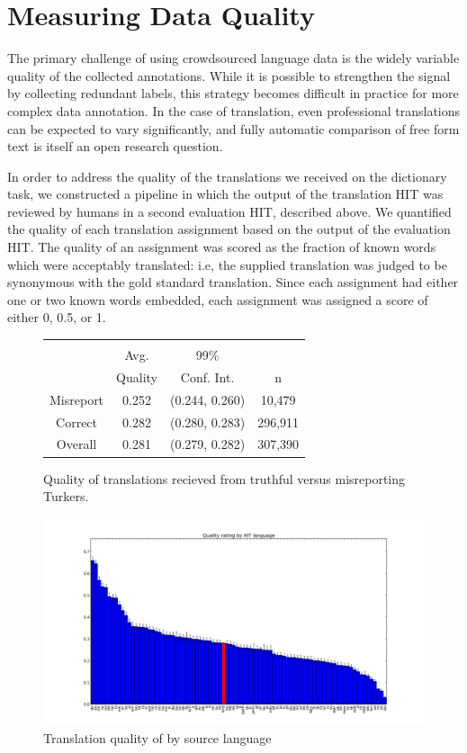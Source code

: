 \documentclass[11pt]{article}
\begin{document}
\section{Measuring Data Quality}
The primary challenge of using crowdsourced language data is the widely variable quality of the collected annotations. While it is possible to strengthen the signal by collecting redundant labels, this strategy becomes difficult in practice for more complex data annotation. In the case of translation, even professional translations can be expected to vary significantly, and fully automatic comparison of free form text is itself an open research question.

 
In order to address the quality of the translations we received on the dictionary task, we constructed a pipeline in which the output of the translation HIT was reviewed by humans in a second evaluation HIT, described above. We quantified the quality of each translation assignment based on the output of the evaluation HIT. The quality of an assignment was scored as the fraction of known words which were acceptably translated: i.e, the supplied translation was judged to be synonymous with the gold standard translation. Since each assignment had either one or two known words embedded, each assignment was assigned a score of either 0, 0.5, or 1.


\begin{figure}[h]
\centering
\begin{tabular}{cccc}\hline\hline\\
&Avg. & 99\%&\\
&Quality & Conf. Int.&n\\
Misreport&0.252&(0.244, 0.260)&10,479\\
Correct&0.282&(0.280, 0.283)&296,911\\
Overall&0.281&(0.279, 0.282)&307,390\\
\hline\hline
\end{tabular}
\label{mism-tab}
\caption{Quality of translations recieved from truthful versus misreporting Turkers.}
\end{figure}

\begin{figure}[h]
\centering
\includegraphics[width=6in]{figures/quality-hitlang}
\caption{Translation quality of by source language}
\label{hitlangqual-bar}
\end{figure}
\end{document}
